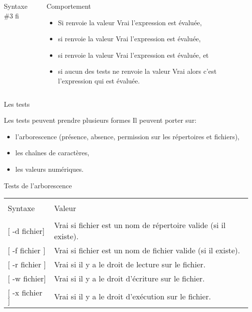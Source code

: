 \begin{frame}{}
\begin{columns}
\begin{column}{6cm}
\begin{block}{Syntaxe \#3}
{          fi
        }
      \end{block}
    \end{column}
    \begin{column}{5cm}
      \begin{block}{Comportement}
        \begin{itemize}
        \item Si  renvoie la valeur Vrai l'expression  est évaluée,\\
        \item si  renvoie la valeur Vrai l'expression  est évaluée,\\
        \item si  renvoie la valeur Vrai l'expression  est évaluée, et\\
        \item si aucun des tests ne renvoie la valeur Vrai alors c'est l'expression  qui est évaluée.
        \end{itemize}
      \end{block}
    \end{column}
  \end{columns}
\end{frame}
\begin{frame}{Les tests}
  \begin{block}{Les tests peuvent prendre plusieurs formes}
    Il peuvent porter sur:
    \begin{itemize}
    \item l'arborescence (présence, absence, permission sur les répertoires et fichiers),
    \item les chaînes de caractères,
    \item les valeurs numériques.
    \end{itemize}
  \end{block}
  \begin{block}{Tests de l'arborescence}
    \begin{center}
      \begin{tabular}{ll}
        \hline\\
        Syntaxe&Valeur\\
        \hline\\
        $[$ -d fichier$]$&Vrai si fichier est un nom de répertoire valide (si il existe).\\[3pt]
        $[$ -f fichier $]$&Vrai si fichier est un nom de fichier valide (si il existe).\\[3pt]
        $[$ -r fichier $]$&Vrai si il y a le droit de lecture sur le fichier.\\[3pt]
        $[$ -w fichier$]$&Vrai si il y a le droit d'écriture sur le fichier.\\[3pt]
        $[$ -x fichier $]$&Vrai si il y a le droit d'exécution sur le fichier.\\[3pt]
        \hline
      \end{tabular}
    \end{center}
  \end{block}
\end{frame}
